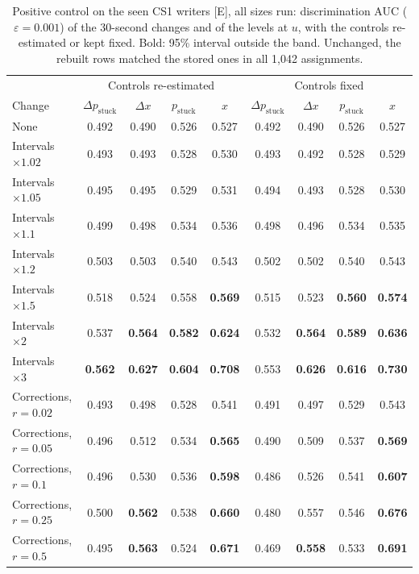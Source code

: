 \begin{table}
  \caption{Positive control on the seen CS1 writers [E], all sizes run: discrimination AUC ($\varepsilon = 0.001$) of the
  30-second changes and of the levels at $u$, with the controls re-estimated or kept fixed. Bold: 95\% interval outside
  the band. Unchanged, the rebuilt rows matched the stored ones in all 1,042 assignments.}
  \label{tab:poscontrol-all}
  \centering\footnotesize
  \setlength{\tabcolsep}{3pt}
  \begin{tabular}{l cccc cccc}
    \toprule
    & \multicolumn{4}{c}{Controls re-estimated} & \multicolumn{4}{c}{Controls fixed} \\
    Change & $\Delta p_{\mathrm{stuck}}$ & $\Delta x$ & $p_{\mathrm{stuck}}$ & $x$ & $\Delta p_{\mathrm{stuck}}$ & $\Delta x$ & $p_{\mathrm{stuck}}$ & $x$ \\
    \midrule
    None & 0.492 & 0.490 & 0.526 & 0.527 & 0.492 & 0.490 & 0.526 & 0.527 \\
    Intervals $\times 1.02$ & 0.493 & 0.493 & 0.528 & 0.530 & 0.493 & 0.492 & 0.528 & 0.529 \\
    Intervals $\times 1.05$ & 0.495 & 0.495 & 0.529 & 0.531 & 0.494 & 0.493 & 0.528 & 0.530 \\
    Intervals $\times 1.1$ & 0.499 & 0.498 & 0.534 & 0.536 & 0.498 & 0.496 & 0.534 & 0.535 \\
    Intervals $\times 1.2$ & 0.503 & 0.503 & 0.540 & 0.543 & 0.502 & 0.502 & 0.540 & 0.543 \\
    Intervals $\times 1.5$ & 0.518 & 0.524 & 0.558 & \textbf{0.569} & 0.515 & 0.523 & \textbf{0.560} & \textbf{0.574} \\
    Intervals $\times 2$ & 0.537 & \textbf{0.564} & \textbf{0.582} & \textbf{0.624} & 0.532 & \textbf{0.564} & \textbf{0.589} & \textbf{0.636} \\
    Intervals $\times 3$ & \textbf{0.562} & \textbf{0.627} & \textbf{0.604} & \textbf{0.708} & 0.553 & \textbf{0.626} & \textbf{0.616} & \textbf{0.730} \\
    Corrections, $r = 0.02$ & 0.493 & 0.498 & 0.528 & 0.541 & 0.491 & 0.497 & 0.529 & 0.543 \\
    Corrections, $r = 0.05$ & 0.496 & 0.512 & 0.534 & \textbf{0.565} & 0.490 & 0.509 & 0.537 & \textbf{0.569} \\
    Corrections, $r = 0.1$ & 0.496 & 0.530 & 0.536 & \textbf{0.598} & 0.486 & 0.526 & 0.541 & \textbf{0.607} \\
    Corrections, $r = 0.25$ & 0.500 & \textbf{0.562} & 0.538 & \textbf{0.660} & 0.480 & 0.557 & 0.546 & \textbf{0.676} \\
    Corrections, $r = 0.5$ & 0.495 & \textbf{0.563} & 0.524 & \textbf{0.671} & 0.469 & \textbf{0.558} & 0.533 & \textbf{0.691} \\
    \bottomrule
  \end{tabular}
\end{table}

